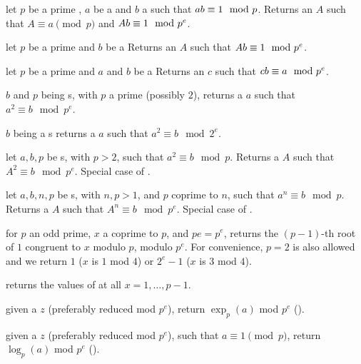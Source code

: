 
 let
$p$ be a prime , $a$ be a  and
$b$ a  such that $a\*b \equiv 1 \mod p$.
Returns an  $A$ such that $A \equiv a \pmod{p}$ and
$A\*b \equiv 1 \mod p^e$.

 let
$p$ be a prime  and $b$ be a 
Returns an  $A$ such that $A\*b \equiv 1 \mod p^e$.

 let
$p$ be a prime  and $a$ and $b$ be a 
Returns an  $c$ such that $c\*b \equiv a \mod p^e$.

 $b$ and $p$ being s, with $p$
a prime (possibly $2$), returns a  $a$ such that $a^2 \equiv b \mod
p^e$.

 $b$ being a s
returns a  $a$ such that $a^2 \equiv b \mod 2^e$.

 let
$a,b,p$ be s, with $p > 2$, such that $a^2\equiv b\mod p$.
Returns a  $A$ such that $A^2 \equiv b \mod p^e$. Special case
of .

 let
$a,b,n,p$ be s, with $n,p > 1$, and $p$ coprime to $n$,
such that $a^n \equiv b \mod p$. Returns a  $A$ such that
$A^n \equiv b \mod p^e$. Special case of .

 for $p$ an odd prime,
$x$ a  coprime to $p$, and $pe = p^e$, returns the $(p-1)$-th root of
$1$ congruent to $x$ modulo $p$, modulo $p^e$. For convenience, $p = 2$ is
also allowed and we return $1$ ($x$ is $1$ mod $4$) or $2^e - 1$ ($x$ is $3$
mod $4$).

 returns the values of
 at all $x = 1, \dots, p-1$.

 given a  $z$ (preferably
reduced mod $p^e$), return $\exp_p(a)$ mod $p^e$ ().

 given a  $z$ (preferably
reduced mod $p^e$), such that $a \equiv 1 \pmod{p}$, return
$\log_p(a)$ mod $p^e$ ().


